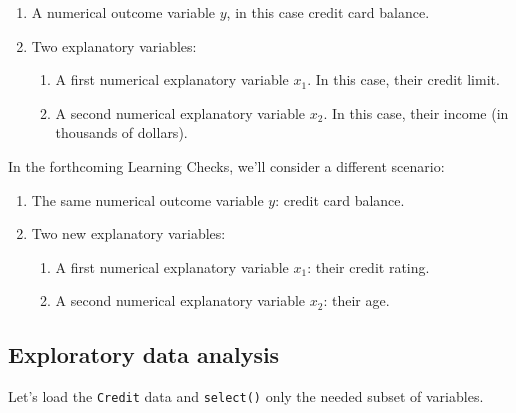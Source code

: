 \documentclass[12pt, krantz2,]{krantz}
\makeatletter
\newenvironment{Shaded}{\begin{snugshade}}{\end{snugshade}}
\newcommand{\KeywordTok}[1]{\textcolor[rgb]{0.27,0.27,0.27}{\textbf{#1}}}
\newcommand{\NormalTok}[1]{#1}
\newcommand{\OperatorTok}[1]{\textcolor[rgb]{0.43,0.43,0.43}{\textbf{#1}}}
\newcommand{\StringTok}[1]{\textcolor[rgb]{0.5,0.5,0.5}{#1}}
\providecommand{\tightlist}{%
  \setlength{\itemsep}{0pt}\setlength{\parskip}{0pt}}
\newenvironment{kframe}{%
\medskip{}
\setlength{\fboxsep}{.8em}
 \def\at@end@of@kframe{}%
 \ifinner\ifhmode%
  \def\at@end@of@kframe{\end{minipage}}%
  \begin{minipage}{\columnwidth}%
 \fi\fi%
 \def\FrameCommand##1{\hskip\@totalleftmargin \hskip-\fboxsep
 \colorbox{shadecolor}{##1}\hskip-\fboxsep
     \hskip-\linewidth \hskip-\@totalleftmargin \hskip\columnwidth}%
 \MakeFramed {\advance\hsize-\width
   \@totalleftmargin\z@ \linewidth\hsize
   \@setminipage}}%
 {\par\unskip\endMakeFramed%
 \at@end@of@kframe}
\renewenvironment{Shaded}{\begin{kframe}}{\end{kframe}}
\makeatother
\begin{document}
\begin{enumerate}
\def\labelenumi{\arabic{enumi}.}
\tightlist
\item
  A numerical outcome variable \(y\), in this case credit card balance.
\item
  Two explanatory variables:

  \begin{enumerate}
  \def\labelenumii{\arabic{enumii}.}
  \tightlist
  \item
    A first numerical explanatory variable \(x_1\). In this case, their credit limit.
  \item
    A second numerical explanatory variable \(x_2\). In this case, their income (in thousands of dollars).
  \end{enumerate}
\end{enumerate}

In the forthcoming Learning Checks, we'll consider a different scenario:

\begin{enumerate}
\def\labelenumi{\arabic{enumi}.}
\tightlist
\item
  The same numerical outcome variable \(y\): credit card balance.
\item
  Two new explanatory variables:

  \begin{enumerate}
  \def\labelenumii{\arabic{enumii}.}
  \tightlist
  \item
    A first numerical explanatory variable \(x_1\): their credit rating.
  \item
    A second numerical explanatory variable \(x_2\): their age.
  \end{enumerate}
\end{enumerate}

\hypertarget{model3EDA}{%
\subsection{Exploratory data analysis}\label{model3EDA}}

Let's load the \texttt{Credit} data and \texttt{select()} only the needed subset of variables.

\begin{Shaded}
\end{Shaded}
\end{document}
